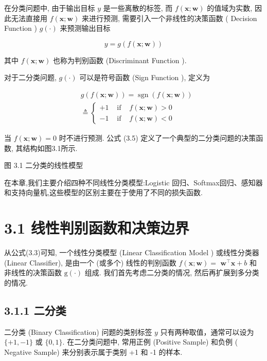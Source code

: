 \documentclass[10pt]{article}
\begin{document}
在分类问题中, 由于输出目标 $y$ 是一些离散的标签, 而 $f(\boldsymbol{x} ; \boldsymbol{w})$ 的值域为实数, 因此无法直接用 $f(\boldsymbol{x} ; \boldsymbol{w})$ 来进行预测, 需要引入一个非线性的决策函数 ( Decision Function ) $g(\cdot)$ 来预测输出目标


\begin{equation*}
y=g(f(\boldsymbol{x} ; \boldsymbol{w})) \tag{3.3}
\end{equation*}


其中 $f(\boldsymbol{x} ; \boldsymbol{w})$ 也称为判别函数 (Discriminant Function ).

对于二分类问题, $g(\cdot)$ 可以是符号函数 (Sign Function ), 定义为

$$
\begin{aligned}
& g(f(\boldsymbol{x} ; \boldsymbol{w}))=\operatorname{sgn}(f(\boldsymbol{x} ; \boldsymbol{w})) \\
& \triangleq\left\{\begin{array}{lll}
+1 & \text { if } & f(\boldsymbol{x} ; \boldsymbol{w})>0 \\
-1 & \text { if } & f(\boldsymbol{x} ; \boldsymbol{w})<0
\end{array}\right.
\end{aligned}
$$

当 $f(\boldsymbol{x} ; \boldsymbol{w})=0$ 时不进行预测. 公式 (3.5) 定义了一个典型的二分类问题的决策函数, 其结构如图3.1所示.



图 3.1 二分类的线性模型

在本章,我们主要介绍四种不同线性分类模型:Logistic 回归、Softmax回归、感知器和支持向量机,这些模型的区别主要在于使用了不同的损失函数.

\section*{3.1 线性判别函数和决策边界}
从公式(3.3)可知, 一个线性分类模型 (Linear Classification Model ) 或线性分类器 (Linear Classifier), 是由一个 (或多个) 线性的判别函数 $f(\boldsymbol{x} ; \boldsymbol{w})=$ $\boldsymbol{w}^{\top} \boldsymbol{x}+b$ 和非线性的决策函数 $\mathrm{g}(\cdot)$ 组成. 我们首先考虑二分类的情况, 然后再扩展到多分类的情况.

\subsection*{3.1.1 二分类}
二分类 (Binary Classification) 问题的类别标签 $y$ 只有两种取值，通常可以设为 $\{+1,-1\}$ 或 $\{0,1\}$. 在二分类问题中, 常用正例 (Positive Sample) 和负例 ( Negative Sample) 来分别表示属于类别 +1 和 -1 的样本.
\end{document}

